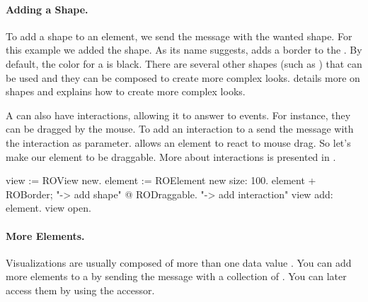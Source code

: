 \documentclass[a4paper,10pt,twoside]{book}
\begin{document}
\paragraph{Adding a Shape.}
To add a shape to an element, we send the \ct{+} message with the wanted shape. For this example we added the  shape. As its name suggests,  adds a border to the . By default, the color for a  is black. There are several other shapes (such as \sd{}) that can be used and they can be composed to create more complex looks.  details more on shapes and explains how to create more complex looks.

A  can also have interactions, allowing it to answer to events. For instance, they can be dragged by the mouse. To add an interaction to a  send the  message with the interaction as parameter.  allows an element to react to mouse drag. So let's make our element to be draggable. More about interactions is presented in .

\begin{code}{}
view := ROView new.
element := ROElement new size: 100.
element 
	+ ROBorder; "-> add shape"
	@ RODraggable. "-> add interaction"
view add: element.
view open.
\end{code}


\paragraph{More Elements.}
Visualizations are usually composed of more than one data value . You can add more elements to a  by sending the message  with a collection of . You can later access them by using the  accessor. 
\end{document}
